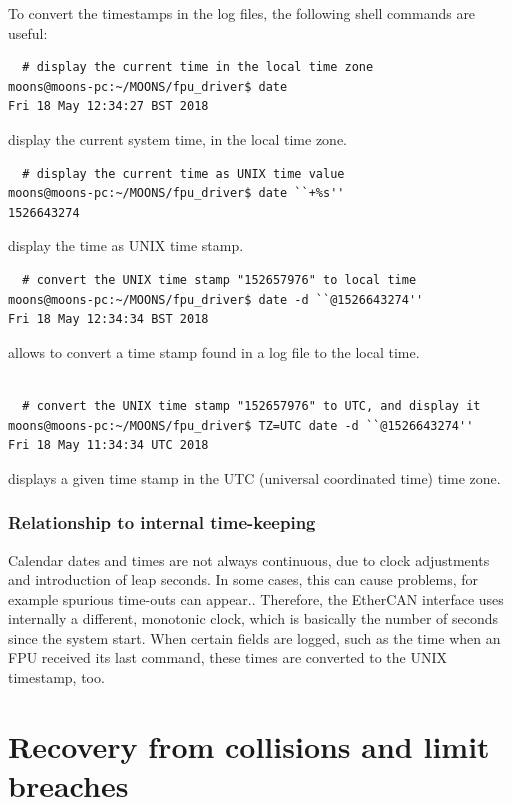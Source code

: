 \documentclass[11pt,a4paper]{scrartcl}
\begin{document}
To convert the timestamps in the log files, the following
shell commands are useful:

\begin{verbatim}
  # display the current time in the local time zone
moons@moons-pc:~/MOONS/fpu_driver$ date
Fri 18 May 12:34:27 BST 2018
\end{verbatim}
display the current system time, in the local time zone.

\begin{verbatim}
  # display the current time as UNIX time value
moons@moons-pc:~/MOONS/fpu_driver$ date ``+%s''
1526643274
\end{verbatim}
display the time as UNIX time stamp.

\begin{verbatim}
  # convert the UNIX time stamp "152657976" to local time
moons@moons-pc:~/MOONS/fpu_driver$ date -d ``@1526643274''
Fri 18 May 12:34:34 BST 2018
\end{verbatim}
allows to convert a time stamp found in a log file to
the local time.

\begin{verbatim}
  
  # convert the UNIX time stamp "152657976" to UTC, and display it
moons@moons-pc:~/MOONS/fpu_driver$ TZ=UTC date -d ``@1526643274''
Fri 18 May 11:34:34 UTC 2018
\end{verbatim}
displays a given time stamp in the UTC (universal coordinated time)
time zone.

\subsubsection{Relationship to internal time-keeping}
Calendar dates and times are not always continuous, due to clock
adjustments and introduction of leap seconds. In some cases, this can
cause problems, for example spurious time-outs can appear.. Therefore,
the EtherCAN interface uses internally a different, monotonic clock, which is
basically the number of seconds since the system start. When certain
fields are logged, such as the time when an FPU received its last
command, these times are converted to the UNIX timestamp, too.


\section{Recovery from collisions and limit breaches}
\label{sec:recovery}
\end{document}
